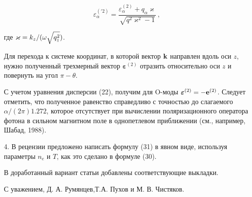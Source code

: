 \documentclass[12pt]{article}
\def\mprl{\mbox{\tiny $\|$}}
\newcommand{\bs}{\boldsymbol}
\begin{document}
   $$\varepsilon^{(\prime 2)}_\alpha = \frac{\varepsilon^{(2)}_\alpha + q_\alpha \varkappa}
   {\sqrt{q^2 \varkappa^2 - 1}} \, ,$$
 
   где $\varkappa = k_z/(\omega \sqrt{q_{\mprl}^2})$. 
   
   Для перехода к системе координат, в которой вектор ${\bf k}$ направлен вдоль оси $z$, 
   нужно полученный трехмерный вектор ${\bs \varepsilon}^{(2)}$ отразить относительно оси $z$ и 
   повернуть на угол $\pi - \theta$. 

   С учетом уравнения дисперсии (22), получим для O-моды  ${\bs \varepsilon}^{(2)} = - {\bf e}^{(2)}$. 
   Следует отметить, что полученное равенство справедливо  с точностью до слагаемого $\alpha/(2\pi) 1.272$, 
   которое отсутствует при вычислении поляризационного оператора фотона в сильном магнитном поле в 
   однопетлевом приближении (см., например, Шабад, 1988).   
      
   

    
   4. В рецензии предложено  написать формулу (31) в явном виде, используя 
   параметры $n_e$ и $T$, как это сделано в формуле (30).

   В доработанный вариант статьи добавлены соответствующие выкладки.    

\vspace{5mm}

   С уважением, Д. А. Румянцев,Т.А. Пухов и М. В. Чистяков. 
\end{document}

